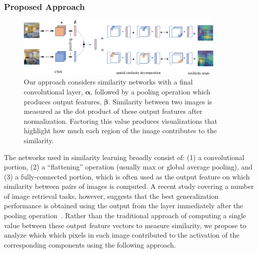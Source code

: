 \documentclass[12pt]{article}
\begin{document}
\subsubsection{Proposed Approach}
\newlength{\mywidth}
\setlength{\mywidth}{.9in}

\begin{figure}
    \centering
    \includegraphics[width=0.9\textwidth]{figs/process.png}
    \caption[Proposed approach to visualizing similarity]{Our approach considers similarity networks with a final convolutional layer, $\boldsymbol{\alpha}$, followed by a pooling operation which produces output features, $\boldsymbol{\beta}$. Similarity between two images is measured as the dot product of these output features after normalization.  Factoring this value produces visualizations that highlight how much each region of the image contributes to the similarity.}
    \label{fig:visApproach}
\end{figure}

The networks used in similarity learning broadly consist of: (1) a convolutional portion, (2) a ``flattening'' operation (usually max or global average pooling), and (3) a fully-connected portion, which is often used as the output feature on which similarity between pairs of images is computed. A recent study covering a number of image retrieval tasks, however, suggests that the best generalization performance is obtained using the output from the layer immediately after the pooling operation~\cite{vo2018generalization}. Rather than the traditional approach of computing a single value between these output feature vectors to measure similarity, we propose to analyze which which pixels in each image contributed to the activation of the corresponding components using the following approach.
\end{document}
